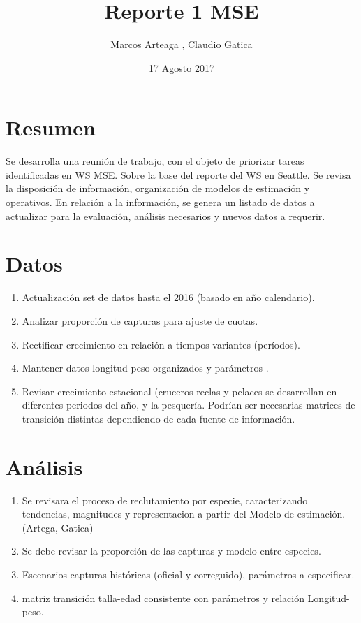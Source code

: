\documentclass[]{article}
\title{Reporte 1 MSE}
\author{Marcos Arteaga , Claudio Gatica}
\date{17 Agosto 2017}
\begin{document}
\maketitle

\section{Resumen}\label{resumen}

Se desarrolla una reunión de trabajo, con el objeto de priorizar tareas
identificadas en WS MSE. Sobre la base del reporte del WS en Seattle. Se
revisa la disposición de información, organización de modelos de
estimación y operativos. En relación a la información, se genera un
listado de datos a actualizar para la evaluación, análisis necesarios y
nuevos datos a requerir.

\section{Datos}\label{datos}

\begin{enumerate}
\def\labelenumi{\arabic{enumi}.}
\item
  Actualización set de datos hasta el 2016 (basado en año calendario).
\item
  Analizar proporción de capturas para ajuste de cuotas.
\item
  Rectificar crecimiento en relación a tiempos variantes (períodos).
\item
  Mantener datos longitud-peso organizados y parámetros .
\item
  Revisar crecimiento estacional (cruceros reclas y pelaces se
  desarrollan en diferentes periodos del año, y la pesquería. Podrían
  ser necesarias matrices de transición distintas dependiendo de cada
  fuente de información.
\end{enumerate}

\section{Análisis}\label{analisis}

\begin{enumerate}
\def\labelenumi{\arabic{enumi})}
\item
  Se revisara el proceso de reclutamiento por especie, caracterizando
  tendencias, magnitudes y representacion a partir del Modelo de
  estimación. (Artega, Gatica)
\item
  Se debe revisar la proporción de las capturas y modelo entre-especies.
\item
  Escenarios capturas históricas (oficial y correguido), parámetros a
  especificar.
\item
  matriz transición talla-edad consistente con parámetros y relación
  Longitud-peso.
\end{enumerate}
\end{document}
